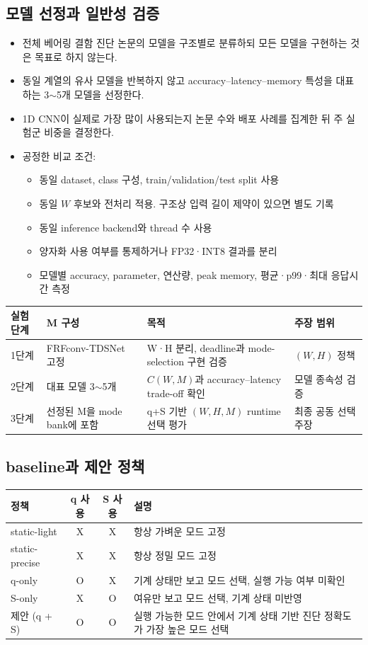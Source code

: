 \documentclass[10pt]{article}
\begin{document}
\subsection{모델 선정과 일반성 검증}
\begin{itemize}
\item 전체 베어링 결함 진단 논문의 모델을 구조별로 분류하되 모든 모델을 구현하는 것은 목표로 하지 않는다.
\item 동일 계열의 유사 모델을 반복하지 않고 accuracy--latency--memory 특성을 대표하는 3$\sim$5개 모델을 선정한다.
\item 1D CNN이 실제로 가장 많이 사용되는지 논문 수와 배포 사례를 집계한 뒤 주 실험군 비중을 결정한다.
\item 공정한 비교 조건:
\begin{itemize}
\item 동일 dataset, class 구성, train/validation/test split 사용
\item 동일 $W$ 후보와 전처리 적용. 구조상 입력 길이 제약이 있으면 별도 기록
\item 동일 inference backend와 thread 수 사용
\item 양자화 사용 여부를 통제하거나 FP32·INT8 결과를 분리
\item 모델별 accuracy, parameter, 연산량, peak memory, 평균·p99·최대 응답시간 측정
\end{itemize}
\end{itemize}
\begin{center}\footnotesize
\begin{tabular}{@{}L{1.8cm}L{3.5cm}L{5.0cm}L{3.2cm}@{}}
\toprule
실험 단계 & M 구성 & 목적 & 주장 범위 \\ \midrule
1단계 & FRFconv-TDSNet 고정 & W·H 분리, deadline과 mode-selection 구현 검증 & $(W,H)$ 정책 \\
2단계 & 대표 모델 3$\sim$5개 & $C(W,M)$과 accuracy--latency trade-off 확인 & 모델 종속성 검증 \\
3단계 & 선정된 M을 mode bank에 포함 & q+S 기반 $(W,H,M)$ runtime 선택 평가 & 최종 공동 선택 주장 \\
\bottomrule
\end{tabular}
\end{center}

\subsection{baseline과 제안 정책}
\begin{center}\footnotesize
\begin{tabular}{@{}lccL{6.5cm}@{}}
\toprule
정책 & q 사용 & S 사용 & 설명 \\ \midrule
static-light & X & X & 항상 가벼운 모드 고정 \\
static-precise & X & X & 항상 정밀 모드 고정 \\
q-only & O & X & 기계 상태만 보고 모드 선택, 실행 가능 여부 미확인 \\
S-only & X & O & 여유만 보고 모드 선택, 기계 상태 미반영 \\
제안 (q + S) & O & O & 실행 가능한 모드 안에서 기계 상태 기반 진단 정확도가 가장 높은 모드 선택 \\
\bottomrule
\end{tabular}
\end{center}
\end{document}
